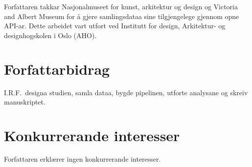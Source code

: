 Forfattaren takkar Nasjonalmuseet for kunst, arkitektur og design
og Victoria and Albert Museum for \aa{} gjere samlingsdataa sine
tilgjengelege gjennom opne API-ar.
Dette arbeidet vart utfort ved Institutt for design,
Arkitektur- og designhogskolen i Oslo (AHO).

\section*{Forfattarbidrag}

I.R.F.\ designa studien, samla dataa, bygde pipelinen,
utforte analysane og skreiv manuskriptet.

\section*{Konkurrerande interesser}

Forfattaren erkl\ae rer ingen konkurrerande interesser.




